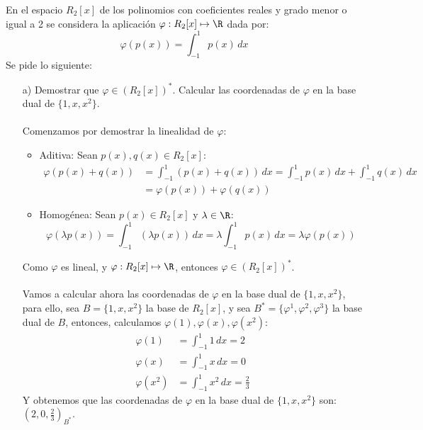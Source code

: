 \begin{ejercicio}
	En el espacio $R_2[x]$ de los polinomios con coeficientes reales y grado menor o igual a 2 se considera la aplicación
	$\varphi : R_2[x] \mapsto \R$ dada por:
	\begin{equation*}
		\varphi(p(x)) = \int_{-1}^{1} p(x)  \,dx
	\end{equation*}
	Se pide lo siguiente:
	\begin{enumerate}
		\item[a)] Demostrar que $\varphi \in (R_2[x])^{*}$. Calcular las coordenadas de $\varphi$ en la base dual de $\{ 1,x,x^2\}$.
			\\ \\
			Comenzamos por demostrar la linealidad de $\varphi$:
			\begin{itemize}
				\item Aditiva: Sean $p(x),q(x) \in R_2[x]$:
				      \begin{align*}
					      \varphi(p(x)+q(x)) &= \int_{-1}^{1} (p(x)+q(x))  \,dx = \int_{-1}^{1} p(x)  \,dx + \int_{-1}^{1} q(x)  \,dx \\&= \varphi(p(x)) + \varphi(q(x))
				      \end{align*}
				\item Homogénea: Sean $p(x) \in R_2[x]$ y $\lambda \in \R$:
				      \begin{equation*}
					      \varphi(\lambda p(x)) = \int_{-1}^{1} (\lambda p(x))  \,dx = \lambda \int_{-1}^{1} p(x)  \,dx = \lambda \varphi(p(x))
				      \end{equation*}
			\end{itemize}
			Como $\varphi$ es lineal, y $\varphi : R_2[x] \mapsto \R$, entonces $\varphi \in (R_2[x])^{*}$. \\ \\
			Vamos a calcular ahora las coordenadas de $\varphi$ en la base dual de $\{ 1,x,x^2\}$, para ello, sea $B = \{ 1,x,x^2\}$ la base de $R_2[x]$, y sea $B^{*} = \{ \varphi^1,\varphi^2,\varphi^3\}$ la base dual de $B$, entonces,
			calculamos $\varphi(1),\varphi(x),\varphi(x^2)$:
			\begin{align*}
				\varphi(1)   & = \int_{-1}^{1} 1  \,dx = 2             \\
				\varphi(x)   & = \int_{-1}^{1} x  \,dx = 0             \\
				\varphi(x^2) & = \int_{-1}^{1} x^2  \,dx = \frac{2}{3}
			\end{align*}
			Y obtenemos que las coordenadas de $\varphi$ en la base dual de $\{ 1,x,x^2\}$ son: $\left(2,0,\frac{2}{3}\right)_{B^{*}}$.

\end{enumerate}
\end{ejercicio}
